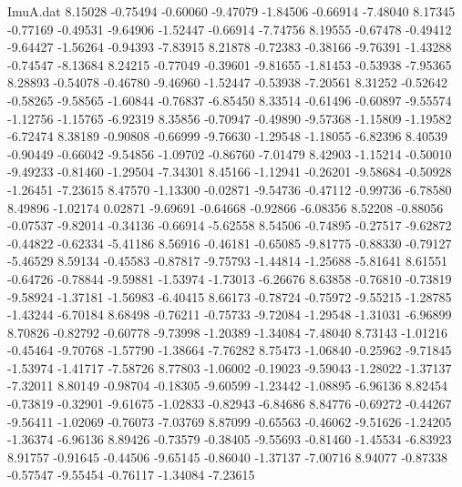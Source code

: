 \begin{filecontents}{ImuA.dat}
   8.15028   -0.75494   -0.60060   -9.47079   -1.84506   -0.66914   -7.48040
   8.17345   -0.77169   -0.49531   -9.64906   -1.52447   -0.66914   -7.74756
   8.19555   -0.67478   -0.49412   -9.64427   -1.56264   -0.94393   -7.83915
   8.21878   -0.72383   -0.38166   -9.76391   -1.43288   -0.74547   -8.13684
   8.24215   -0.77049   -0.39601   -9.81655   -1.81453   -0.53938   -7.95365
   8.28893   -0.54078   -0.46780   -9.46960   -1.52447   -0.53938   -7.20561
   8.31252   -0.52642   -0.58265   -9.58565   -1.60844   -0.76837   -6.85450
   8.33514   -0.61496   -0.60897   -9.55574   -1.12756   -1.15765   -6.92319
   8.35856   -0.70947   -0.49890   -9.57368   -1.15809   -1.19582   -6.72474
   8.38189   -0.90808   -0.66999   -9.76630   -1.29548   -1.18055   -6.82396
   8.40539   -0.90449   -0.66042   -9.54856   -1.09702   -0.86760   -7.01479
   8.42903   -1.15214   -0.50010   -9.49233   -0.81460   -1.29504   -7.34301
   8.45166   -1.12941   -0.26201   -9.58684   -0.50928   -1.26451   -7.23615
   8.47570   -1.13300   -0.02871   -9.54736   -0.47112   -0.99736   -6.78580
   8.49896   -1.02174    0.02871   -9.69691   -0.64668   -0.92866   -6.08356
   8.52208   -0.88056   -0.07537   -9.82014   -0.34136   -0.66914   -5.62558
   8.54506   -0.74895   -0.27517   -9.62872   -0.44822   -0.62334   -5.41186
   8.56916   -0.46181   -0.65085   -9.81775   -0.88330   -0.79127   -5.46529
   8.59134   -0.45583   -0.87817   -9.75793   -1.44814   -1.25688   -5.81641
   8.61551   -0.64726   -0.78844   -9.59881   -1.53974   -1.73013   -6.26676
   8.63858   -0.76810   -0.73819   -9.58924   -1.37181   -1.56983   -6.40415
   8.66173   -0.78724   -0.75972   -9.55215   -1.28785   -1.43244   -6.70184
   8.68498   -0.76211   -0.75733   -9.72084   -1.29548   -1.31031   -6.96899
   8.70826   -0.82792   -0.60778   -9.73998   -1.20389   -1.34084   -7.48040
   8.73143   -1.01216   -0.45464   -9.70768   -1.57790   -1.38664   -7.76282
   8.75473   -1.06840   -0.25962   -9.71845   -1.53974   -1.41717   -7.58726
   8.77803   -1.06002   -0.19023   -9.59043   -1.28022   -1.37137   -7.32011
   8.80149   -0.98704   -0.18305   -9.60599   -1.23442   -1.08895   -6.96136
   8.82454   -0.73819   -0.32901   -9.61675   -1.02833   -0.82943   -6.84686
   8.84776   -0.69272   -0.44267   -9.56411   -1.02069   -0.76073   -7.03769
   8.87099   -0.65563   -0.46062   -9.51626   -1.24205   -1.36374   -6.96136
   8.89426   -0.73579   -0.38405   -9.55693   -0.81460   -1.45534   -6.83923
   8.91757   -0.91645   -0.44506   -9.65145   -0.86040   -1.37137   -7.00716
   8.94077   -0.87338   -0.57547   -9.55454   -0.76117   -1.34084   -7.23615

\end{filecontents}
